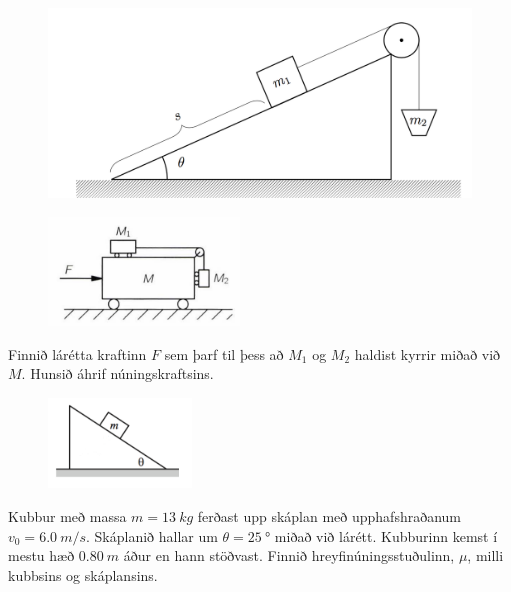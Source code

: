\begin{enumerate}[label = \textbf{Dæmi \thechapter.\arabic*.}]
\begin{figure}[H]
    \centering
    \includegraphics[scale = 0.5]{images/vatnsfata.png}
\end{figure}

\begin{minipage}{\linewidth}
\begin{figure}
\vspace{-0.5cm}
\includegraphics[width=2in]{images/feyn.png}
\end{figure}


\item Finnið lárétta kraftinn $F$ sem þarf til þess að $M_1$ og $M_2$ haldist kyrrir miðað við $M$. Hunsið áhrif núningskraftsins.

\end{minipage}

\newpage

\begin{minipage}{\linewidth}
\begin{figure}
\vspace{-1cm}
\includegraphics[width=1.5in]{images/skasson.png}
\end{figure}

\item Kubbur með massa $m = \SI{13}{kg}$ ferðast upp skáplan með upphafshraðanum $v_0 = \SI{6.0}{m/s}$. Skáplanið hallar um $\theta = \SI{25}{\degree}$ miðað við lárétt. Kubburinn kemst í mestu hæð $\SI{0,80}{m}$ áður en hann stöðvast. Finnið hreyfinúningsstuðulinn, $\mu$, milli kubbsins og skáplansins.
\end{minipage}


\end{enumerate}
